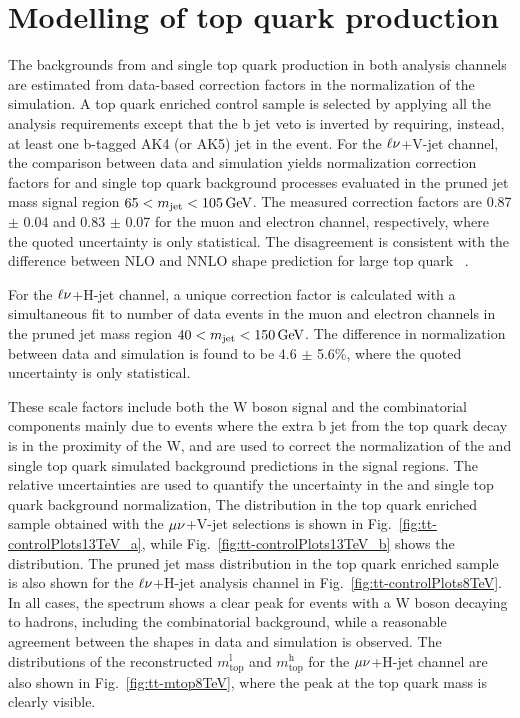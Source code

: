 \section{Modelling of top quark production}\label{sec:ttbar}

The backgrounds from \ttbar and single top quark production in both analysis channels are estimated from data-based correction factors in the normalization of the simulation.
A top quark enriched control sample is selected by applying all the analysis requirements except that the b jet veto is inverted by requiring, instead, at least one b-tagged AK4 (or AK5) jet in the event.
For the $\ell\nu$+V-jet channel, the comparison between data and simulation yields normalization correction factors for \ttbar and single top quark background processes evaluated in the pruned jet mass signal region
$65 < m_{\text{jet}} < 105\,\text{Ge\hspace{-.08em}V}$. The measured correction factors are 0.87 $\pm$ 0.04 and 0.83 $\pm$ 0.07 for the muon and electron channel, respectively, where the quoted uncertainty is only statistical.
The disagreement is consistent with the difference between NLO and NNLO shape prediction for large top quark \pt~\cite{Czakon:2015owf}.

For the $\ell\nu$+H-jet channel, a unique correction factor is calculated with a simultaneous fit to number of data events in the muon and electron channels in the pruned jet mass region $40 < m_{\text{jet}} < 150\,\text{Ge\hspace{-.08em}V}$.
The difference in normalization between data and simulation is found to be 4.6 $\pm$ 5.6\%, where the quoted uncertainty is only statistical. 

These scale factors include both the W boson signal and the combinatorial components mainly due to events where the extra b jet from the top quark decay is in the proximity of the W, and are used to correct the normalization
of the \ttbar and single top quark simulated background predictions in the signal regions. The relative uncertainties are used to quantify the uncertainty in the \ttbar and single top quark background normalization,
The \mJ distribution in the top quark enriched sample obtained with the $\mu\nu$+V-jet selections is shown in Fig.~\ref{fig:tt-controlPlots13TeV_a}, while Fig.~\ref{fig:tt-controlPlots13TeV_b} shows the \nsubj distribution.
The pruned jet mass distribution in the top quark enriched sample is also shown for the $\ell\nu$+H-jet analysis channel in Fig.~\ref{fig:tt-controlPlots8TeV}.
In all cases, the \mJ spectrum shows a clear peak for events with a W boson decaying to hadrons, including the combinatorial background, while a reasonable agreement between the shapes in data and simulation is observed.
The distributions of the reconstructed $m_\mathrm{top}^\mathrm{l}$ and $m_\mathrm{top}^\mathrm{h}$ for the $\mu\nu$+H-jet channel are also shown in Fig.~\ref{fig:tt-mtop8TeV}, where the peak at the top quark mass is clearly visible.

